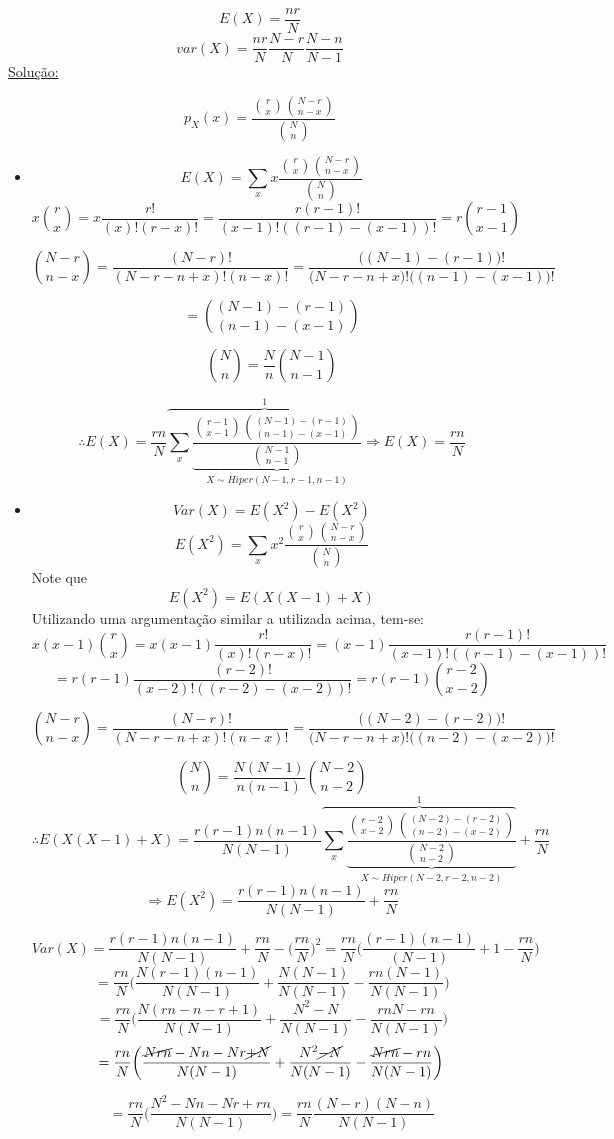 \documentclass[a4paper,12pt]{article}
\begin{document}
$$E(X)=\frac{nr}{N} $$
$$var(X) = \frac{nr}{N} \frac{N-r}{N}  \frac{N-n}{N-1}$$
\underline{Solução:}

$$
p_X(x)= \frac{\binom{r}{x}\binom{N-r}{n-x}}{\binom{N}{n}}
$$
\begin{itemize}
	\item $$
E(X) = \sum\limits_{x}x\frac{\binom{r}{x}\binom{N-r}{n-x}}{\binom{N}{n}}
$$
$$
x \binom{r}{x} =x \frac{r!}{(x)!(r-x)!} = \frac{r(r-1)!}{(x-1)!((r-1)-(x-1))!} = r \binom{r-1}{x-1}
$$

$$
 \binom{N-r}{n-x} = \frac{(N-r)!}{(N-r-n+x)!(n-x)!}= \frac{\bigg((N-1)-(r-1)\bigg)!}{\bigg(N-r-n+x\bigg)!\bigg((n-1)-(x-1)\bigg)!}$$

$$
=  \binom{(N-1)-(r-1)}{(n-1)-(x-1)}
$$

$$
\binom{N}{n} = \frac{N}{n}\binom{N-1}{n-1}
$$


$$ 
\therefore 
E(X) = \frac{rn}{N} \overbrace{\sum\limits_{x}\underbrace{\frac{\binom{r-1}{x-1}\binom{(N-1)-(r-1)}{(n-1)-(x-1)}}{\binom{N-1}{n-1}}}_{X\sim Hiper(N-1,r-1,n-1)}}^{1} \Rightarrow E(X) = \frac{rn}{N}
$$

\newpage 
\item
$$Var(X) = E(X^2) - E(X^2) $$
$$
E(X^2) = \sum\limits_{x}x^2\frac{\binom{r}{x}\binom{N-r}{n-x}}{\binom{N}{n}}
$$
Note que 
$$ E(X^2) = E(X(X-1)+X) $$
Utilizando uma argumentação similar a utilizada acima, tem-se:
$$
x(x-1)\binom{r}{x} =x(x-1) \frac{r!}{(x)!(r-x)!} = (x-1)\frac{r(r-1)!}{(x-1)!((r-1)-(x-1))!} $$
$$
=r(r-1) \frac{(r-2)!}{(x-2)!((r-2)-(x-2))!} = r(r-1)\binom{r-2}{x-2}
$$

$$
\binom{N-r}{n-x} = \frac{(N-r)!}{(N-r-n+x)!(n-x)!}= \frac{\bigg((N-2)-(r-2)\bigg)!}{\bigg(N-r-n+x\bigg)!\bigg((n-2)-(x-2)\bigg)!}$$

$$
\binom{N}{n} = \frac{N(N-1)}{n(n-1)}\binom{N-2}{n-2}
$$
$$ 
\therefore 
E(X(X-1)+X) = \frac{r(r-1)n(n-1)}{N(N-1)} \overbrace{\sum\limits_{x}\underbrace{\frac{\binom{r-2}{x-2}\binom{(N-2)-(r-2)}{(n-2)-(x-2)}}{\binom{N-2}{n-2}}}_{X\sim Hiper(N-2,r-2,n-2)}}^{1}
+ \frac{rn}{N}$$
$$
 \Rightarrow E(X^2) = \frac{r(r-1)n(n-1)}{N(N-1)} +  \frac{rn}{N}
$$

$$
Var(X) =  \frac{r(r-1)n(n-1)}{N(N-1)} +  \frac{rn}{N} - \bigg(\frac{rn}{N}\bigg)^2 = \frac{rn}{N}
\bigg(
\frac{(r-1)(n-1)}{(N-1)} + 1- \frac{rn}{N} 
\bigg)
$$
$$
 = \frac{rn}{N}
\bigg(
\frac{N(r-1)(n-1)}{N(N-1)} + \frac{N(N-1)}{N(N-1)}- \frac{rn(N-1)}{N(N-1)} 
\bigg)
$$
$$
 = \frac{rn}{N}
\bigg(
\frac{N(rn-n-r+1)}{N(N-1)} + \frac{N^2-N}{N(N-1)}- \frac{rnN-rn}{N(N-1)} 
\bigg)
$$
$$
= \frac{rn}{N}
\bigg(
\frac{\cancel{Nrn}-Nn-Nr\cancel{+N}}{N(N-1)} + \frac{N^2\cancel{-N}}{N(N-1)}- \frac{\cancel{Nrn}-rn}{N(N-1)} 
\bigg)
$$

$$
= \frac{rn}{N}
\bigg(
\frac{N^2-Nn-Nr+rn}{N(N-1)} 
\bigg)
=
 \frac{rn}{N}
\frac{(N-r)(N-n)}{N(N-1)} 
$$
\end{itemize}
\end{document}
